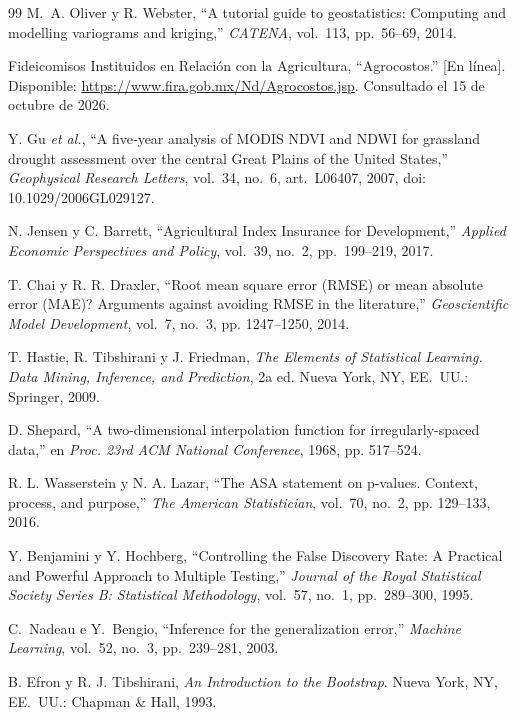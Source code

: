\begin{thebibliography}{99}
M.~A. Oliver y R. Webster, ``A tutorial guide to geostatistics: Computing and modelling variograms and kriging,''
\emph{CATENA}, vol.~113, pp.~56--69, 2014.

Fideicomisos Instituidos en Relación con la Agricultura, ``Agrocostos.'' [En línea]. Disponible: \url{https://www.fira.gob.mx/Nd/Agrocostos.jsp}. Consultado el 15 de octubre de 2026.

Y. Gu \emph{et al.}, ``A five‐year analysis of MODIS NDVI and NDWI for grassland drought assessment over the central Great Plains of the United States,'' \emph{Geophysical Research Letters}, vol.~34, no.~6, art.~L06407, 2007, doi: 10.1029/2006GL029127.

N. Jensen y C. Barrett, ``Agricultural Index Insurance for Development,'' \emph{Applied Economic Perspectives and Policy}, vol.~39, no.~2, pp.~199--219, 2017.

T. Chai y R. R. Draxler, ``Root mean square error (RMSE) or mean absolute error (MAE)? Arguments against avoiding RMSE
in the literature,'' \emph{Geoscientific Model Development}, vol.~7, no.~3, pp. 1247--1250, 2014.

T. Hastie, R. Tibshirani y J. Friedman, \emph{The Elements of Statistical Learning. Data Mining, Inference, and
Prediction}, 2a ed. Nueva York, NY, EE.~UU.: Springer, 2009.

D. Shepard, ``A two-dimensional interpolation function for irregularly-spaced data,'' en \emph{Proc. 23rd ACM National
Conference}, 1968, pp. 517--524.

R. L. Wasserstein y N. A. Lazar, ``The ASA statement on p-values. Context, process, and purpose,'' \emph{The American
Statistician}, vol.~70, no.~2, pp. 129--133, 2016.

Y. Benjamini y Y. Hochberg, ``Controlling the False Discovery Rate: A Practical and Powerful Approach to Multiple Testing,'' \emph{Journal of the Royal Statistical Society Series B: Statistical Methodology}, vol.~57, no.~1, pp.~289--300, 1995.

C.~Nadeau e Y.~Bengio, ``Inference for the generalization error,'' \emph{Machine Learning}, vol.~52, no.~3,
pp.~239--281, 2003.

B. Efron y R. J. Tibshirani, \emph{An Introduction to the Bootstrap}. Nueva York, NY, EE.~UU.: Chapman \& Hall, 1993.


\end{thebibliography}

